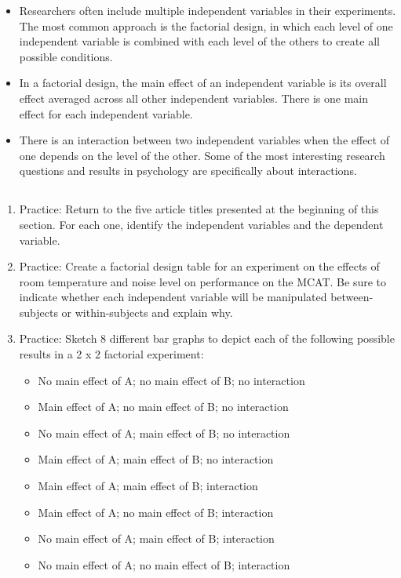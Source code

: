 \begin{itemize}

\item Researchers often include multiple independent variables in their experiments. The most common approach is the factorial design, in which each level of one independent variable is combined with each level of the others to create all possible conditions.
\item In a factorial design, the main effect of an independent variable is its overall effect averaged across all other independent variables. There is one main effect for each independent variable.
\item There is an interaction between two independent variables when the effect of one depends on the level of the other. Some of the most interesting research questions and results in psychology are specifically about interactions.


\end{itemize}

\subsection{}
\begin{fullwidth}
\begin{enumerate}
\item  Practice: Return to the five article titles presented at the beginning of this section. For each one, identify the independent variables and the dependent variable.
\item Practice: Create a factorial design table for an experiment on the effects of room temperature and noise level on performance on the MCAT. Be sure to indicate whether each independent variable will be manipulated between-subjects or within-subjects and explain why.
\item Practice: Sketch 8 different bar graphs to depict each of the following possible results in a 2 x 2 factorial experiment:
\begin{itemize}
\item No main effect of A; no main effect of B; no interaction
\item Main effect of A; no main effect of B; no interaction
\item No main effect of A; main effect of B; no interaction
\item Main effect of A; main effect of B; no interaction
\item Main effect of A; main effect of B; interaction
\item Main effect of A; no main effect of B; interaction
\item No main effect of A; main effect of B; interaction
\item No main effect of A; no main effect of B; interaction
\end{itemize}
\end{enumerate}
\end{fullwidth}  

